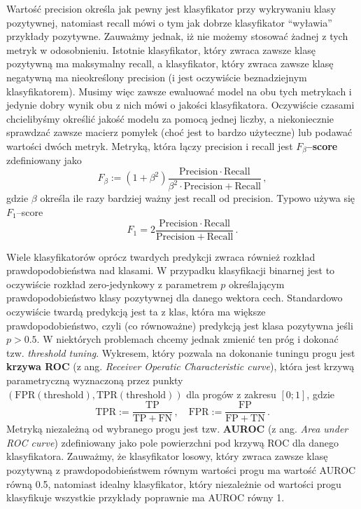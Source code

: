 \documentclass{myclass}
\numberwithin{equation}{section}
\begin{document}
Wartość precision określa jak pewny jest klasyfikator przy wykrywaniu klasy pozytywnej, natomiast
recall mówi o tym jak dobrze klasyfikator \enquote{wyławia} przykłady pozytywne. Zauważmy jednak, iż
nie możemy stosować żadnej z tych metryk w odosobnieniu. Istotnie klasyfikator, który zwraca zawsze
klasę pozytywną ma maksymalny recall, a klasyfikator, który zwraca zawsze klasę negatywną ma
nieokreślony precision (i jest oczywiście beznadziejnym klasyfikatorem). Musimy więc zawsze
ewaluować model na obu tych metrykach i jedynie dobry wynik obu z nich mówi o jakości klasyfikatora.
Oczywiście czasami chcielibyśmy określić jakość modelu za pomocą jednej liczby, a niekoniecznie
sprawdzać zawsze macierz pomyłek (choć jest to bardzo użyteczne) lub podawać wartości dwóch metryk.
Metryką, która łączy precision i recall jest \textbf{\(F_\beta\)--score} zdefiniowany jako
\begin{equation}
    F_\beta := (1 + \beta^2) \frac{\mathrm{Precision} \cdot \mathrm{Recall}}{\beta^2 \cdot \mathrm{Precision} + \mathrm{Recall}}\,, 
\end{equation}
gdzie \(\beta\) określa ile razy bardziej ważny jest recall od precision. Typowo używa się
\(F_1\)--score
\begin{equation}
    F_1 = 2\frac{\mathrm{Precision} \cdot \mathrm{Recall}}{\mathrm{Precision} + \mathrm{Recall}}\,. 
\end{equation}

Wiele klasyfikatorów oprócz twardych predykcji zwraca również rozkład prawdopodobieństwa nad
klasami. W przypadku klasyfikacji binarnej jest to oczywiście rozkład zero-jedynkowy z parametrem
\(p\) określającym prawdopodobieństwo klasy pozytywnej dla danego wektora cech. Standardowo
oczywiście twardą predykcją jest ta z klas, która ma większe prawdopodobieństwo, czyli (co
równoważne) predykcją jest klasa pozytywna jeśli \(p > 0.5\). W niektórych problemach chcemy jednak
zmienić ten próg i dokonać tzw. \textit{threshold tuning}. Wykresem, który pozwala na dokonanie
tuningu progu jest \textbf{krzywa ROC} (z ang. \textit{Receiver Operatic Characteristic curve}),
która jest krzywą parametryczną wyznaczoną przez punkty \((\mathrm{FPR}(\mathrm{threshold}),
\mathrm{TPR}(\mathrm{threshold}))\) dla progów z zakresu \([0;1]\), gdzie
\begin{equation}
    \mathrm{TPR} := \frac{\mathrm{TP}}{\mathrm{TP + FN}}\,,\quad \mathrm{FPR} := \frac{\mathrm{FP}}{\mathrm{FP + TN}}\,.
\end{equation}
Metryką niezależną od wybranego progu jest tzw. \textbf{AUROC} (z ang. \textit{Area under ROC
curve}) zdefiniowany jako pole powierzchni pod krzywą ROC dla danego klasyfikatora. Zauważmy, że
klasyfikator losowy, który zwraca zawsze klasę pozytywną z prawdopodobieństwem równym wartości progu
ma wartość AUROC równą 0.5, natomiast idealny klasyfikator, który niezależnie od wartości progu
klasyfikuje wszystkie przykłady poprawnie ma AUROC równy 1.
\end{document}
